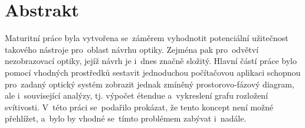 \chapter*{Abstrakt}

Maturitní práce \textit{\thetitle} byla vytvořena se~záměrem vyhodnotit potenciální užitečnost takového nástroje pro~oblast návrhu optiky. Zejména pak pro~odvětví nezobrazovací optiky, jejíž návrh je i~dnes značně složitý. Hlavní částí práce bylo pomocí vhodných prostředků sestavit jednoduchou počítačovou aplikaci schopnou pro~zadaný optický systém zobrazit jednak zmíněný prostorovo-fázový diagram, ale i~související analýzy, tj. výpočet étendue a~vykreslení grafu rozložení svítivosti. V~této práci se~podařilo prokázat, že tento koncept není možné přehlížet, a~bylo by vhodné se~tímto problémem zabývat i~nadále.
